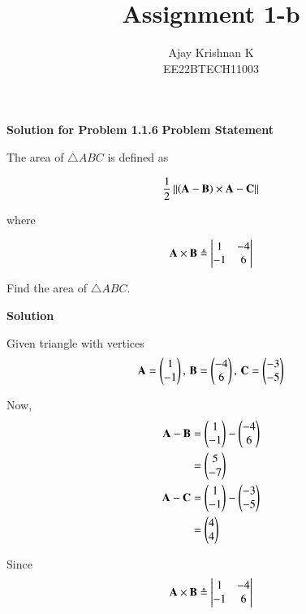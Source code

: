 \documentclass[journal,11pt]{IEEEtran}
\begin{document}
\vspace{3cm}
\author{Ajay Krishnan K\\EE22BTECH11003}

\title{Assignment 1-b}
\maketitle

\textbf{Solution for Problem 1.1.6}
\bigbreak
\textbf{Problem Statement}

The area of $\triangle ABC$ is defined as

\begin{align}
    \frac{1}{2}\left\lVert{\ensuremath{\left(\mathbf{A}-\mathbf{B}\right)}\times {\mathbf{A}-\mathbf{C}}}\right\rVert
\end{align}

where

\begin{align}
    \mathbf{A}\times\mathbf{B} \triangleq \begin{vmatrix}1 & -4 \\-1 & 6\end{vmatrix}
\end{align}

Find the area of $\triangle ABC$.

\textbf{Solution}

Given triangle with vertices
\begin{align}
    \label{eq:tri-pts}
    \mathbf{A} = \begin{pmatrix} 1 \\ -1 \end{pmatrix},\,
    \mathbf{B} = \begin{pmatrix}-4 \\ 6\end{pmatrix},\,
    \mathbf{C} = \begin{pmatrix}-3 \\ -5\end{pmatrix}
\end{align}

Now,
\begin{align}
    \mathbf{A} - \mathbf{B} &= \begin{pmatrix} 1 \\ -1 \end{pmatrix} - \begin{pmatrix}-4 \\ 6\end{pmatrix}\\
                      &= \begin{pmatrix}5  \\ -7\end{pmatrix}\\
    \mathbf{A} - \mathbf{C} &= \begin{pmatrix} 1 \\ -1 \end{pmatrix} - \begin{pmatrix}-3 \\ -5\end{pmatrix}\\
                      &= \begin{pmatrix}4  \\ 4\end{pmatrix}
\end{align}

Since
\begin{align}
    \mathbf{A}\times\mathbf{B} \triangleq \begin{vmatrix}1 & -4 \\-1 & 6\end{vmatrix}
\end{align}
\end{document}

